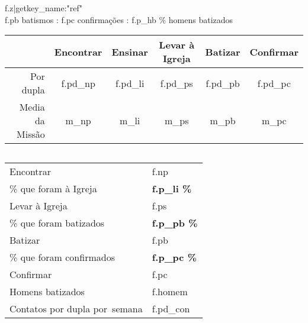 \begin{frame}{ {{ f.z|getkey_name:"ref" }} \\ {{ f.pb }} batismos : {{ f.pc }} confirmações : {{ f.p_hb }}\% homens batizados }
	\begin{center}
	\begin{tabular}{@{} r|c|c|c|c|c @{}}
		& Encontrar & Ensinar & Levar à Igreja & Batizar & Confirmar \\
		\hline
		Por dupla & {{ f.pd_np }} & {{ f.pd_li }} & {{ f.pd_ps }} & {{ f.pd_pb }} & {{ f.pd_pc }} \\
		Media da Missão &
			{{ m_np }} &
			{{ m_li }} &
			{{ m_ps }} &
			{{ m_pb }} &
			{{ m_pc }}
			\\
	\end{tabular}

	\begin{columns}
			\vspace{.3cm}
			\begin{tabular}{p{4cm}|l}
				Encontrar & {{ f.np }} \\
				\textcolor{RoyalBlue!90}{\% que foram à Igreja} & \textbf{ {{ f.p_li }}\%} \\
				Levar à Igreja & {{ f.ps }} \\
				\textcolor{RoyalBlue!90}{\% que foram batizados} & \textbf{ {{ f.p_pb }}\%} \\
				Batizar & {{ f.pb }} \\
				\textcolor{RoyalBlue!90}{\% que foram confirmados} & \textbf{ {{ f.p_pc }}\%} \\
				Confirmar & {{ f.pc }} \\
				\hline
				\hline
				Homens batizados & {{ f.homem }} \\
				Contatos por dupla \mbox{por semana} & {{ f.pd_con }}
			\end{tabular}
	\end{columns}
	\end{center}
\end{frame}
